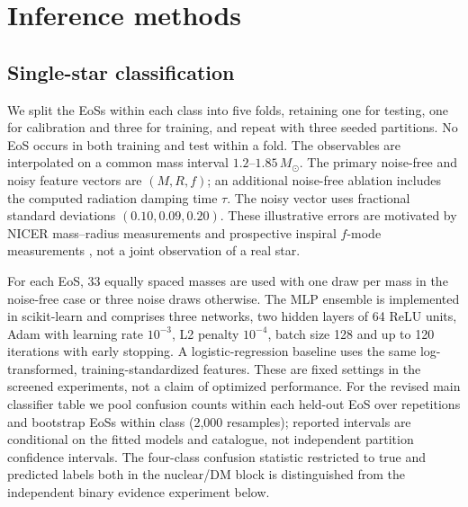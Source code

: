 \documentclass[11pt,a4paper]{article}
\newcommand{\Msun}{M_\odot}
\begin{document}
\section{Inference methods}
\subsection{Single-star classification}
We split the EoSs within each class into five folds, retaining one for testing, one for calibration and three for training, and repeat with three seeded partitions. No EoS occurs in both training and test within a fold. The observables are interpolated on a common mass interval $1.2$--$1.85\,\Msun$. The primary noise-free and noisy feature vectors are $(M,R,f)$; an additional noise-free ablation includes the computed radiation damping time $\tau$. The noisy vector uses fractional standard deviations $(0.10,0.09,0.20)$. These illustrative errors are motivated by NICER mass--radius measurements \citep{Riley19,Miller19,Choudhury24,Salmi24} and prospective inspiral $f$-mode measurements \citep{Williams22}, not a joint observation of a real star.

For each EoS, 33 equally spaced masses are used with one draw per mass in the noise-free case or three noise draws otherwise. The MLP ensemble \citep{Lakshminarayanan17} is implemented in scikit-learn \citep{Pedregosa11} and comprises three networks, two hidden layers of 64 ReLU units, Adam with learning rate $10^{-3}$, L2 penalty $10^{-4}$, batch size 128 and up to 120 iterations with early stopping. A logistic-regression baseline uses the same log-transformed, training-standardized features. These are fixed settings in the screened experiments, not a claim of optimized performance. For the revised main classifier table we pool confusion counts within each held-out EoS over repetitions and bootstrap EoSs within class (2,000 resamples); reported intervals are conditional on the fitted models and catalogue, not independent partition confidence intervals. The four-class confusion statistic restricted to true and predicted labels both in the nuclear/DM block is distinguished from the independent binary evidence experiment below.
\end{document}
